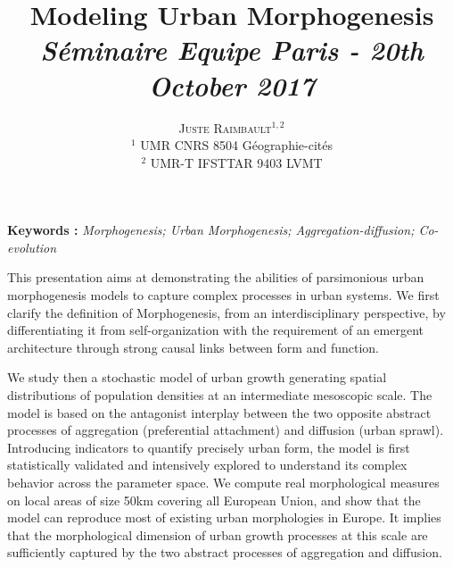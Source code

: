 \documentclass[11pt]{article}
\newcommand{\noun}[1]{\textsc{#1}}
\begin{document}
\title{Modeling Urban Morphogenesis
\bigskip\\
\textit{Séminaire Equipe Paris - 20th October 2017}
}
\author{\noun{Juste Raimbault}$^{1,2}$\medskip\\
$^1$ UMR CNRS 8504 Géographie-cités\\
$^2$ UMR-T IFSTTAR 9403 LVMT
}
\date{}

\maketitle

\justify



\textbf{Keywords : }\textit{Morphogenesis; Urban Morphogenesis; Aggregation-diffusion; Co-evolution}

\bigskip

This presentation aims at demonstrating the abilities of parsimonious urban morphogenesis models to capture complex processes in urban systems. We first clarify the definition of Morphogenesis, from an interdisciplinary perspective, by differentiating it from self-organization with the requirement of an emergent architecture through strong causal links between form and function.


We study then a stochastic model of urban growth generating spatial distributions of population densities at an intermediate mesoscopic scale. The model is based on the antagonist interplay between the two opposite abstract processes of aggregation (preferential attachment) and diffusion (urban sprawl). Introducing indicators to quantify precisely urban form, the model is first statistically validated and intensively explored to understand its complex behavior across the parameter space. We compute real morphological measures on local areas of size 50km covering all European Union, and show that the model can reproduce most of existing urban morphologies in Europe. It implies that the morphological dimension of urban growth processes at this scale are sufficiently captured by the two abstract processes of aggregation and diffusion.
\end{document}
